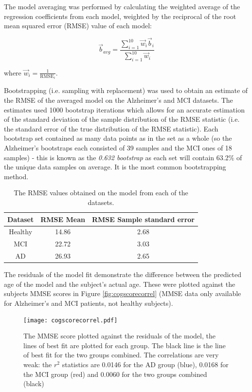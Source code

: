 The model averaging was performed by calculating the weighted average of the regression coefficients from each model, weighted by the reciprocal of the root mean squared error (RMSE) value of each model:

\begin{equation} \vec{b}_{avg} = \frac{\sum\limits_{i=1}^{10} \vec{w}_i \vec{b}_i }{ \sum\limits_{i=1}^{10} \vec{w}_i}\end{equation}

where $\vec{w}_i = \frac{1}{\textrm{RMSE}_i}$.

Bootstrapping (i.e. sampling with replacement) \cite{Witten2011} was used to obtain an estimate of the RMSE of the averaged model on the Alzheimer's and MCI datasets. The estimates used 1000 bootstrap iterations which allows for an accurate estimation of the standard deviation of the sample distribution of the RMSE statistic (i.e. the standard error of the true distribution of the RMSE statistic). Each bootstrap set contained as many data points as in the set as a whole (so the Alzheimer's bootstraps each consisted of 39 samples and the MCI ones of 18 samples) - this is known as the \textit{0.632 bootstrap} as each set will contain 63.2\% of the unique data samples on average. It is the most common bootstrapping method. \cite{Witten2011}
\begin{table}[h!]
\begin{center}
\begin{tabular}[h!]{|c|c|c|}
\hline
Dataset & RMSE Mean & RMSE Sample standard error \\
\hline
Healthy & 14.86 & 2.68 \\
\hline
MCI & 22.72 & 3.03 \\
\hline
AD & 26.93 & 2.65\\
\hline
\end{tabular}
\caption{The RMSE values obtained on the model from each of the datasets.}
\label{tab:rmsevals}
\end{center}
\end{table}

The residuals of the model fit demonstrate the difference between the predicted age of the model and the subject's actual age. These were plotted against the subjects MMSE scores in Figure \ref{fig:cogscorecorrel} (MMSE data only available for Alzheimer's and MCI patients, not healthy subjects).

\begin{figure}[h!]
  \centering
    \texttt{[image: cogscorecorrel.pdf]}
    \caption{The MMSE score plotted against the residuals of the model, the lines of best fit are plotted for each group. The black line is the line of best fit for the two groups combined. The correlations are very weak: the $r^2$ statistics are 0.0146 for the AD group (blue), 0.0168 for the MCI group (red) and 0.0060 for the two groups combined (black)}
    \label{fig:cogscorecorel}
\end{figure}






